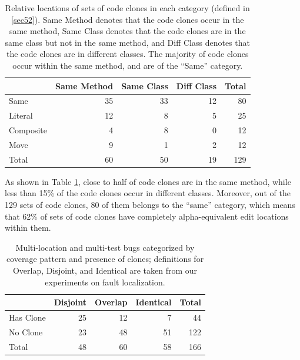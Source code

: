 \documentclass[10pt, conference]{IEEEtran}
\begin{document}
\begin{table}
{\begin{center}
\begin{tabular} {lrrrr}
\toprule
& Same Method & Same Class & Diff Class & Total\\
\hline
Same & 35 & 33 & 12 & 80 \\ 
Literal & 12 & 8 & 5 & 25 \\
Composite & 4 & 8 & 0 & 12 \\
Move & 9 & 1 & 2 & 12 \\
\midrule
Total & 60 & 50 & 19  & 129\\
\bottomrule
\end{tabular}
\end{center}
}
\caption{
    Relative locations of sets of code clones in each category (defined in \ref{sec52}).
Same Method denotes that the code clones occur in the same method, Same Class denotes that the code
clones are in the same class but not in the same method, and Diff Class denotes that the
code clones are in different classes.
The majority of code clones occur within the same method, and are of
the ``Same'' category.}
\label{tab:clones_loc}
\end{table}

As shown in Table \ref{tab:clones_loc}, close to half of code clones are in the same method, while less than
15\% of the code clones occur in different classes. Moreover, out of the 129 sets of code clones,
80 of them belongs to the ``same'' category, which means that 62\% of sets of code clones have completely
alpha-equivalent edit locations within them.


\begin{table}
	{\begin{center}
			\begin{tabular} {lrrrr}
				\toprule
				& Disjoint & Overlap & Identical & Total \\
				\midrule
				Has Clone & 25 & 12 & 7 & 44 \\
				No Clone & 23 & 48 & 51 &  122 \\
                \midrule
				Total & 48 & 60 & 58 & 166 \\
                \bottomrule
			\end{tabular}
		\end{center}
	}
	\caption{Multi-location and multi-test bugs categorized by coverage pattern and presence of clones; definitions for Overlap, Disjoint, and Identical are taken from our experiments on fault localization.}
	\label{tab:cov_clones}
\end{table}
\end{document}
